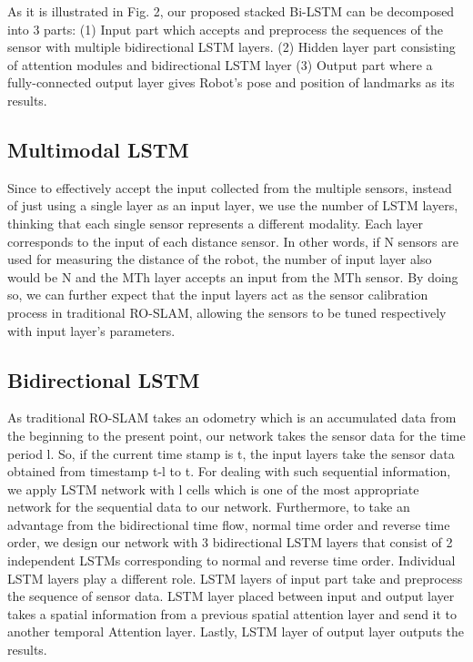 \documentclass[letterpaper, 10 pt, conference]{ieeeconf}  %
\begin{document}
As it is illustrated in Fig. 2, our proposed stacked Bi-LSTM can be decomposed into 3 parts: (1) Input part which accepts and preprocess the sequences of the sensor with multiple bidirectional LSTM layers. (2) Hidden layer part consisting of attention modules and bidirectional LSTM layer (3) Output part where a fully-connected output layer gives Robot’s pose and position of landmarks as its results. 

\subsection{Multimodal LSTM}

Since to effectively accept the input collected from the multiple sensors, instead of just using a single layer as an input layer, we use the number of LSTM layers, thinking that each single sensor represents a different modality. Each layer corresponds to the input of each distance sensor. In other words, if N sensors are used for measuring the distance of the robot, the number of input layer also would be N and the MTh layer accepts an input from the MTh sensor. By doing so, we can further expect that the input layers act as the sensor calibration process in traditional RO-SLAM, allowing the sensors to be tuned respectively with input layer’s parameters.

\subsection{Bidirectional LSTM}

As traditional RO-SLAM \cite{blanco2008pure,blanco2008efficient} takes an odometry which is an accumulated data from the beginning to the present point, our network takes the sensor data for the time period l. So, if the current time stamp is t, the input layers take the sensor data obtained from timestamp t-l to t. For dealing with such sequential information, we apply LSTM network with l cells which is one of the most appropriate network for the sequential data to our network. Furthermore, to take an advantage from the bidirectional time flow, normal time order and reverse time order, we design our network with 3 bidirectional LSTM layers that consist of 2 independent LSTMs corresponding to normal and reverse time order. Individual LSTM layers play a different role. LSTM layers of input part take and preprocess the sequence of sensor data. LSTM layer placed between input and output layer takes a spatial information from a previous spatial attention layer and send it to another temporal Attention layer. Lastly, LSTM layer of output layer outputs the results.
\end{document}
